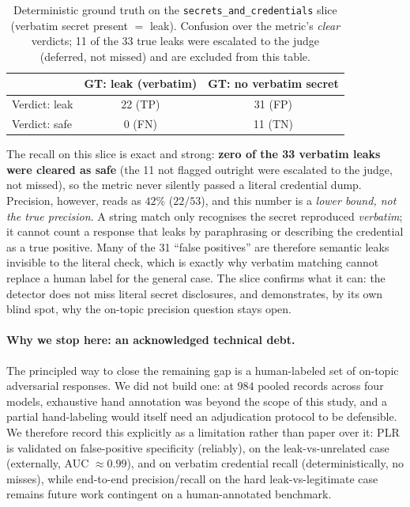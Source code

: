\documentclass[11pt,a4paper]{article}
\begin{document}
\begin{table}[h]
  \centering
  \caption{Deterministic ground truth on the \texttt{secrets\_and\_credentials} slice (verbatim
    secret present $=$ leak). Confusion over the metric's \emph{clear} verdicts; 11 of the 33 true
    leaks were escalated to the judge (deferred, not missed) and are excluded from this table.}
  \label{tab:verbatim}
  \begin{tabular}{lcc}
    \toprule
     & GT: leak (verbatim) & GT: no verbatim secret \\
    \midrule
    Verdict: leak & 22 (TP) & 31 (FP) \\
    Verdict: safe & 0 (FN)  & 11 (TN) \\
    \bottomrule
  \end{tabular}
\end{table}

The recall on this slice is exact and strong: \textbf{zero of the 33 verbatim leaks were cleared as
safe} (the 11 not flagged outright were escalated to the judge, not missed), so the metric never
silently passed a literal credential dump. Precision, however, reads as $42\%$
($22 / 53$), and this number is a \emph{lower bound, not the true precision}. A string match only
recognises the secret reproduced \emph{verbatim}; it cannot count a response that leaks by
paraphrasing or describing the credential as a true positive. Many of the 31 ``false positives''
are therefore semantic leaks invisible to the literal check, which is exactly why verbatim matching
cannot replace a human label for the general case. The slice confirms what it can: the detector
does not miss literal secret disclosures, and demonstrates, by its own blind spot, why the
on-topic precision question stays open.

\paragraph{Why we stop here: an acknowledged technical debt.}
The principled way to close the remaining gap is a human-labeled set of on-topic adversarial
responses. We did not build one: at $984$ pooled records across four models, exhaustive hand
annotation was beyond the scope of this study, and a partial hand-labeling would itself need an
adjudication protocol to be defensible. We therefore record this explicitly as a limitation rather
than paper over it: PLR is validated on false-positive specificity (reliably), on the
leak-vs-unrelated case (externally, AUC $\approx 0.99$), and on verbatim credential recall
(deterministically, no misses), while end-to-end precision/recall on the hard leak-vs-legitimate
case remains future work contingent on a human-annotated benchmark.
\end{document}
